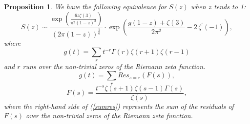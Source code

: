 \documentclass{article}
\newtheorem{proposition}[theorem]{Proposition}
\begin{document}
   \begin{proposition} \label{prop:equiv} We have the following equivalence for $S(z)$ when $z$ tends to 1:
  $$S(z) \sim \dfrac{\exp\left({\frac {6z\zeta  \left( 3 \right) }{{\pi }^{2} \left( 1-z \right) ^{2
}}}\right)}{ \left(2\pi(1-z)\right)^{\frac1{6}}}\cdot \exp\left(
{\dfrac {g(1-z)+\zeta  \left( 3 \right) }{2{\pi
}^{2}}}-2\,\zeta^\prime \left(-1 \right)\right ), $$ 
where
 $$ g(t)=\sum_r t^{-r}\Gamma(r)\zeta(r+1)\zeta(r-1) $$
and $r$ runs over the non-trivial zeros of the Riemann zeta
 function.
\begin{equation}\label{sumres}
 g(t)=\sum_r Res_{s=r}(F(s)),
 \end{equation}
  \begin{equation}\label{integrand}
  F(s) =\frac{t^{-s}\zeta(s+1)\zeta(s-1)\Gamma(s)}{\zeta(s)},
 \end{equation}
 where the right-hand side of (\ref{sumres}) represents the sum of the residuals
 of $F(s)$ over the non-trivial zeros of the Riemann zeta
 function.






\end{proposition}
\end{document}

